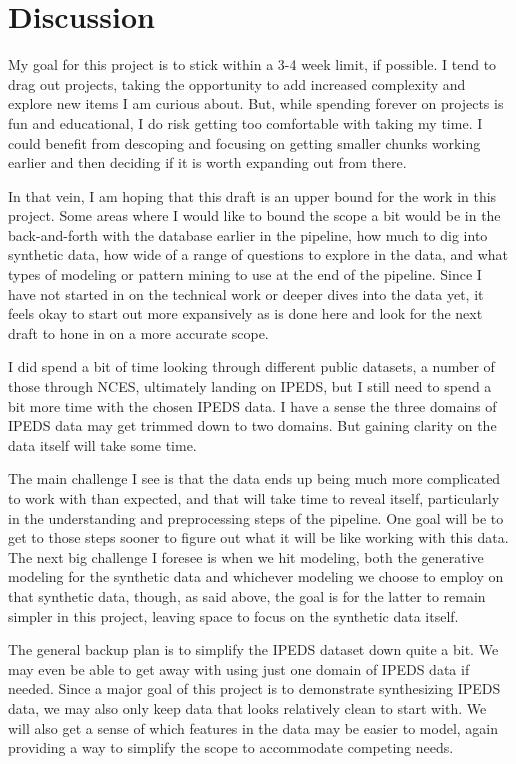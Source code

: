 \documentclass[sigconf, authorversion, nonacm]{acmart}
\begin{document}
\section{Discussion}
    My goal for this project is to stick within a 3-4 week limit, if possible. I tend to drag out projects, taking the opportunity to add increased complexity and explore new items I am curious about. But, while spending forever on projects is fun and educational, I do risk getting too comfortable with taking my time. I could benefit from descoping and focusing on getting smaller chunks working earlier and then deciding if it is worth expanding out from there.

    In that vein, I am hoping that this draft is an upper bound for the work in this project. Some areas where I would like to bound the scope a bit would be in the back-and-forth with the database earlier in the pipeline, how much to dig into synthetic data, how wide of a range of questions to explore in the data, and what types of modeling or pattern mining to use at the end of the pipeline. Since I have not started in on the technical work or deeper dives into the data yet, it feels okay to start out more expansively as is done here and look for the next draft to hone in on a more accurate scope.

    I did spend a bit of time looking through different public datasets, a number of those through NCES, ultimately landing on IPEDS, but I still need to spend a bit more time with the chosen IPEDS data. I have a sense the three domains of IPEDS data may get trimmed down to two domains. But gaining clarity on the data itself will take some time.

    The main challenge I see is that the data ends up being much more complicated to work with than expected, and that will take time to reveal itself, particularly in the understanding and preprocessing steps of the pipeline. One goal will be to get to those steps sooner to figure out what it will be like working with this data. The next big challenge I foresee is when we hit modeling, both the generative modeling for the synthetic data and whichever modeling we choose to employ on that synthetic data, though, as said above, the goal is for the latter to remain simpler in this project, leaving space to focus on the synthetic data itself.

    The general backup plan is to simplify the IPEDS dataset down quite a bit. We may even be able to get away with using just one domain of IPEDS data if needed. Since a major goal of this project is to demonstrate synthesizing IPEDS data, we may also only keep data that looks relatively clean to start with. We will also get a sense of which features in the data may be easier to model, again providing a way to simplify the scope to accommodate competing needs.
\end{document}
